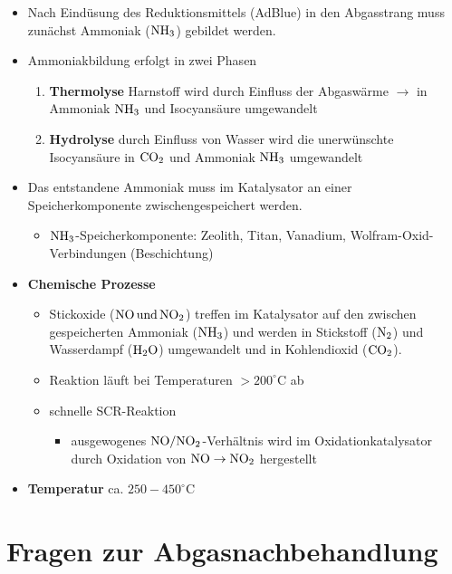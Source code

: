 \begin{itemize}
\item
  Nach Eindüsung des Reduktionsmittels (AdBlue) in den Abgasstrang muss
  zunächst Ammoniak ($\ce{NH3}$) gebildet werden.
\item
  Ammoniakbildung erfolgt in zwei Phasen

  \begin{enumerate}
  \item
    \textbf{Thermolyse} Harnstoff wird durch Einfluss der Abgaswärme
    $\to$ in Ammoniak $\ce{NH3}$ und Isocyansäure umgewandelt
  \item
    \textbf{Hydrolyse} durch Einfluss von Wasser wird die unerwünschte
    Isocyansäure in $\ce{CO2}$ und Ammoniak $\ce{NH3}$ umgewandelt
  \end{enumerate}
\item
  Das entstandene Ammoniak muss im Katalysator an einer
  Speicherkomponente zwischengespeichert werden.

  \begin{itemize}
  \item
    $\ce{NH3}$-Speicherkomponente: Zeolith, Titan, Vanadium,
    Wolfram-Oxid-Verbindungen (Beschichtung)
  \end{itemize}
\item
  \textbf{Chemische Prozesse}

  \begin{itemize}
  \item
    Stickoxide ($\ce{NO und NO2}$) treffen im Katalysator auf den
    zwischen gespeicherten Ammoniak ($\ce{NH3}$) und werden in
    Stickstoff ($\ce{N2}$) und Wasserdampf ($\ce{H2O}$) umgewandelt
    und in Kohlendioxid ($\ce{CO2}$).
  \item
    Reaktion läuft bei Temperaturen $> 200^\circ\text{C}$ ab
  \item
    schnelle SCR-Reaktion

    \begin{itemize}
    \item
      ausgewogenes $\ce{NO/NO2}$-Verhältnis wird im
      Oxidationkatalysator durch Oxidation von $\ce{NO} \to \ce{NO2}$
      hergestellt
    \end{itemize}
  \end{itemize}
\item
  \textbf{Temperatur} ca. $250 - 450^\circ\text{C}$
\end{itemize}

\section{Fragen zur
Abgasnachbehandlung}\label{fragen-zur-abgasnachbehandlung}

